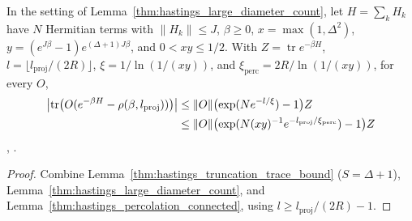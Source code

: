 \begin{lemma}
    \label{thm:hastings_percolation_large_diameter}
    \leanok
    In the setting of Lemma~\ref{thm:hastings_large_diameter_count}, let
    $H=\sum_kH_k$ have $N$ Hermitian terms with $\|H_k\|\le J$, $\beta\ge0$,
    $x=\max(1,\Delta^2)$, $y=(e^{J\beta}-1)e^{(\Delta+1)J\beta}$, and
    $0<xy\le1/2$. With $Z=\operatorname{tr}e^{-\beta H}$,
    $l=\lfloor l_{\mathrm{proj}}/(2R)\rfloor$, $\xi=1/\ln(1/(xy))$, and
    $\xi_{\mathrm{perc}}=2R/\ln(1/(xy))$, for every $O$,
    \begin{align}
        \bigl|\operatorname{tr}\bigl(O(e^{-\beta H}-\rho(\beta,l_{\mathrm{proj}}))\bigr)\bigr|
         & \le\|O\|\bigl(\exp(Ne^{-l/\xi})-1\bigr)Z
        \notag                                                                               \\
         & \le\|O\|\bigl(\exp(N(xy)^{-1}e^{-l_{\mathrm{proj}}/\xi_{\mathrm{perc}}})-1\bigr)Z
        \label{eq:hastings_percolation_large_diameter}
    \end{align}
    \cite[eq.~(perc2), lines 1227--1254]{Hastings2006Solving},
    \cite{gap:hastings05_percolation_cluster_size,gap:hastings05_cluster_boundary}.
\end{lemma}
\begin{proof}
    \leanok
    Combine Lemma~\ref{thm:hastings_truncation_trace_bound} ($S=\Delta+1$),
    Lemma~\ref{thm:hastings_large_diameter_count}, and
    Lemma~\ref{thm:hastings_percolation_connected}, using
    $l\ge l_{\mathrm{proj}}/(2R)-1$.
\end{proof}
